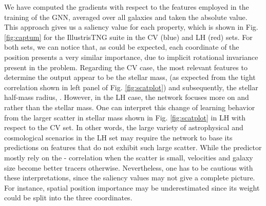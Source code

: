 \documentclass[twocolumn]{aastex631}
\begin{document}
We have computed the gradients with respect to the features employed in the training of the GNN, averaged over all galaxies and taken the absolute value. This approach gives us a saliency value for each property, which is shown in Fig. \ref{fig:captum} for the IllustrisTNG suite in the CV (blue) and LH (red) sets. For both sets, we can notice that, as could be expected, each coordinate of the position presents a very similar importance, due to implicit rotational invariance present in the problem. Regarding the CV case, the most relevant features to determine the output appear to be the stellar mass,  (as expected from the tight correlation shown in left panel of Fig. \ref{fig:scatplot}) and subsequently, the stellar half-mass radius, . However, in the LH case, the network focuses more on  and  rather than the stellar mass. One can interpret this change of learning behavior from the larger scatter in stellar mass shown in Fig. \ref{fig:scatplot} in LH with respect to the CV set. In other words, the large variety of astrophysical and cosmological scenarios in the LH set may require the network to base its predictions on features that do not exhibit such large scatter. While the predictor mostly rely on the - correlation when the scatter is small, velocities and galaxy size become better tracers otherwise. Nevertheless, one has to be cautious with these interpretations, since the saliency values may not give a complete picture. For instance, spatial position importance may be underestimated since its weight could be split into the three coordinates.
\end{document}
